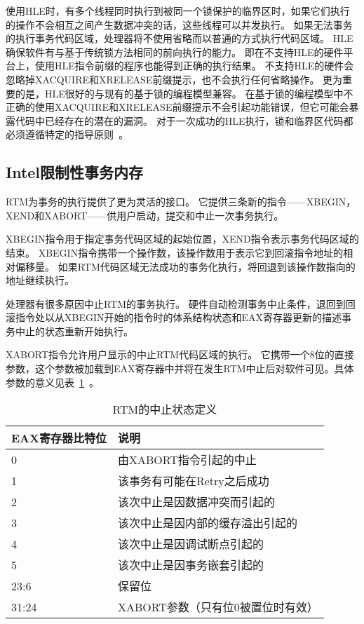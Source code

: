 使用HLE时，有多个线程同时执行到被同一个锁保护的临界区时，如果它们执行的操作不会相互之间产生数据冲突的话，这些线程可以并发执行。
如果无法事务的执行事务代码区域，处理器将不使用省略而以普通的方式执行代码区域。
HLE确保软件有与基于传统锁方法相同的前向执行的能力。
即在不支持HLE的硬件平台上，使用HLE指令前缀的程序也能得到正确的执行结果。
不支持HLE的硬件会忽略掉XACQUIRE和XRELEASE前缀提示，也不会执行任何省略操作。
更为重要的是，HLE很好的与现有的基于锁的编程模型兼容。
在基于锁的编程模型中不正确的使用XACQUIRE和XRELEASE前缀提示不会引起功能错误，但它可能会暴露代码中已经存在的潜在的漏洞。
对于一次成功的HLE执行，锁和临界区代码都必须遵循特定的指导原则~\cite{Intel2015Intel}。

\subsection{Intel限制性事务内存}
RTM为事务的执行提供了更为灵活的接口。
它提供三条新的指令——XBEGIN， XEND和XABORT——供用户启动，提交和中止一次事务执行。

XBEGIN指令用于指定事务代码区域的起始位置，XEND指令表示事务代码区域的结束。
XBEGIN指令携带一个操作数，该操作数用于表示它到回滚指令地址的相对偏移量。
如果RTM代码区域无法成功的事务化执行，将回退到该操作数指向的地址继续执行。

处理器有很多原因中止RTM的事务执行。
硬件自动检测事务中止条件，退回到回滚指令处以从XBEGIN开始的指令时的体系结构状态和EAX寄存器更新的描述事务中止的状态重新开始执行。

XABORT指令允许用户显示的中止RTM代码区域的执行。
它携带一个8位的直接参数，这个参数被加载到EAX寄存器中并将在发生RTM中止后对软件可见。具体参数的意义见表~\ref{tab:rtm_status}~。

\begin{table}[htbp]
  \centering
  \caption{RTM的中止状态定义}
  \label{tab:rtm_status}
  \begin{tabular}{ll}
    \toprule
       EAX寄存器比特位 & 说明 \\
    \midrule
      0     & 由XABORT指令引起的中止 \\
      1     & 该事务有可能在Retry之后成功\\
      2     & 该次中止是因数据冲突而引起的 \\
      3     & 该次中止是因内部的缓存溢出引起的\\
      4     & 该次中止是因调试断点引起的 \\
      5     & 该次中止是因事务嵌套引起的 \\
      23:6  & 保留位\\
      31:24 & XABORT参数（只有位0被置位时有效） \\
    \bottomrule
  \end{tabular}
\end{table}

